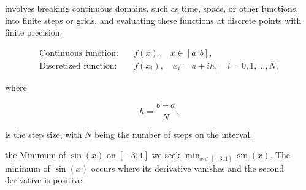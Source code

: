  involves breaking
continuous domains, such as time, space, or other functions,
into finite steps or grids, and evaluating these
functions at discrete points with finite precision:


\begin{align*}
    \text{Continuous function:}\quad &f(x),\quad x \in [a, b],\\
    \text{Discretized function:}\quad &f(x_i),\quad x_i = a + i h,\quad i = 0, 1, \ldots, N,
\end{align*}

where 

\begin{equation}
    h = \frac{b-a}{N},
\end{equation}

\vspace{1.5em}
is the step size, with $N$ being the number of steps on the interval.


 the Minimum of $\sin(x)$ on $[-3,1]$ we seek
 $\min_{x \in [-3,1]} \sin(x)$. The minimum of $\sin(x)$ occurs where its derivative vanishes and the second derivative is positive.

